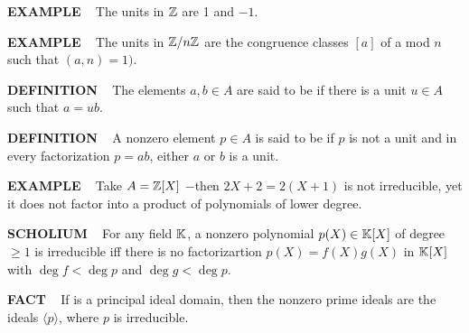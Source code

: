 \begin{x}{\small\bf EXAMPLE} \ %
The units in $\mathbb{Z}$ are 1 and $-1$.
\end{x}

\vspace{0.1cm}


\begin{x}{\small\bf EXAMPLE} \ %
The units in $\mathbb{Z}/n\mathbb{Z}$ are the congruence classes $[a]$ of a mod $n$ such that $(a,n) = 1)$.
\end{x}

\vspace{0.1cm}

\begin{x}{\small\bf DEFINITION} \ %
The elements $a, b \in A$ are said to be 
if there is a unit $u \in A$ such that $a = u b$.
\end{x}

\vspace{0.1cm}


\begin{x}{\small\bf DEFINITION} \ %
A nonzero element $p \in A$ is said to be 
if $p$ is not a unit and in every factorization $p = a b$, either $a$ or $b$ is a unit.
\end{x}



\vspace{0.1cm}

\begin{x}{\small\bf EXAMPLE} \ %
Take $A = \mathbb{Z}[X]$ $-$then $2X + 2 = 2(X + 1)$ is not irreducible, yet it does not factor into a product of polynomials of lower degree.
\end{x}

\vspace{0.1cm}

\begin{x}{\small\bf SCHOLIUM} \ %
For any field $\mathbb{K}$, a nonzero polynomial $p(X) \in \mathbb{K}[X]$ of degree $\geq 1$ is irreducible iff there is no factorizartion 
$p(X) = f(X) g(X)$ in $\mathbb{K}[X]$ with $\deg f < \deg p$ and $\deg g < \deg p$.
\end{x}

\vspace{0.1cm}

\begin{x}{\small\bf FACT} \ %
If \mA is a principal ideal domain, then the nonzero prime ideals are the ideals $\langle p \rangle$, where $p$ is irreducible.
\end{x}

